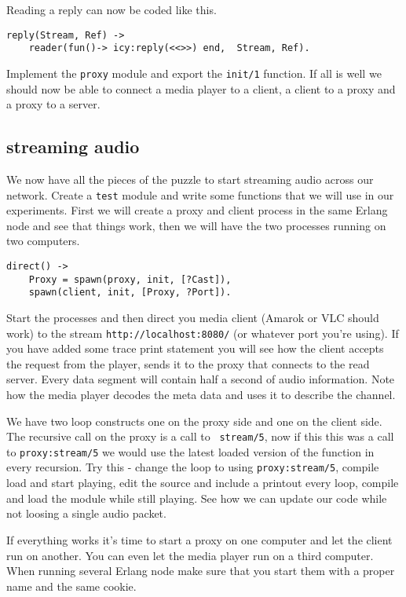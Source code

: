 \documentclass[a4paper,11pt]{article}
\begin{document}
Reading a reply can now be coded like this.

\begin{verbatim}
reply(Stream, Ref) ->
    reader(fun()-> icy:reply(<<>>) end,  Stream, Ref).
\end{verbatim}

Implement the {\tt proxy} module and export the {\tt init/1}
function. If all is well we should now be able to connect a media
player to a client, a client to a proxy and a proxy to a server.


\subsection{streaming audio}

We now have all the pieces of the puzzle to start streaming audio
across our network. Create a {\tt test} module and write some
functions that we will use in our experiments. First we will create a
proxy and client process in the same Erlang node and see that things
work, then we will have the two processes running on two computers.

\begin{verbatim}
direct() ->
    Proxy = spawn(proxy, init, [?Cast]),
    spawn(client, init, [Proxy, ?Port]).
\end{verbatim}

Start the processes and then direct you media client (Amarok or VLC
should work) to the stream {\tt http://localhost:8080/} (or whatever
port you're using). If you have added some trace print statement you
will see how the client accepts the request from the player, sends it
to the proxy that connects to the read server. Every data segment will
contain half a second of audio information. Note how the media player
decodes the meta data and uses it to describe the channel.

\begin{indent}
We have two loop constructs one on the proxy side and one on the
client side. The recursive call on the proxy is a call to {\tt
  stream/5}, now if this this was a call to {\tt proxy:stream/5} we
would use the latest loaded version of the function in every
recursion. Try this - change the loop to using {\tt proxy:stream/5},
compile load and start playing, edit the source and include a printout
every loop, compile and load the module while still playing. See how
we can update our code while not loosing a single audio packet.
\end{indent}

If everything works it's time to start a proxy on one computer and let
the client run on another. You can even let the media player run on a
third computer. When running several Erlang node make sure that you
start them with a proper name and the same cookie.
\end{document}
